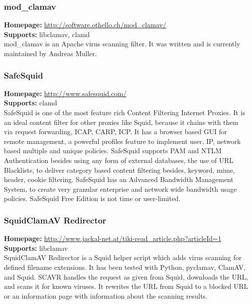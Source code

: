 \documentclass[a4paper,titlepage,12pt]{article}
\begin{document}
    \subsubsection{mod\_clamav}
    \textbf{Homepage:} \url{http://software.othello.ch/mod_clamav/}\\
    \textbf{Supports:} libclamav, clamd\\[4pt]
    mod\_clamav is an Apache virus scanning filter. It was written
    and is currently maintained by Andreas Muller.

    \subsubsection{SafeSquid}
    \textbf{Homepage:} \url{http://www.safesquid.com/}\\
    \textbf{Supports:} clamd\\[4pt]
    SafeSquid is one of the most feature rich Content Filtering Internet
    Proxies. It is an ideal content filter for other proxies like Squid,
    because it chains with them via request forwarding, ICAP, CARP, ICP. It
    has a browser based GUI for remote management, a powerful profiles feature
    to implement user, IP, network based multiple and unique policies.
    SafeSquid supports PAM and NTLM Authentication besides using any form of
    external databases, the use of URL Blacklists, to deliver category based
    content filtering besides, keyword, mime, header, cookie filtering.
    SafeSquid has an Advanced Bandwidth Management System, to create very
    granular enterprise and network wide bandwidth usage policies. SafeSquid
    Free Edition is not time or user-limited.

    \subsubsection{SquidClamAV Redirector}
    \textbf{Homepage:} \url{http://www.jackal-net.at/tiki-read_article.php?articleId=1}\\
    \textbf{Supports:} libclamav\\[4pt]
    SquidClamAV Redirector is a Squid helper script which adds virus scanning
    for defined filename extensions. It has been tested with Python, pyclamav,
    ClamAV, and Squid. SCAVR handles the request as given from Squid, downloads
    the URL, and scans it for known viruses. It rewrites the URL from Squid to
    a blocked URL or an information page with information about the scanning
    results.
\end{document}
